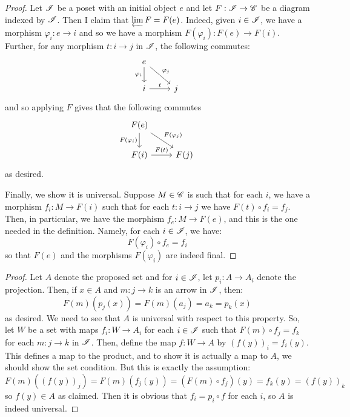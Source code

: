 \documentclass[12pt]{exam}
\begin{document}
\begin{proof}
	Let $\mathscr{I}$ be a poset with an initial object $e$ and let $F : \mathscr{I} \to \mathscr{C}$ be a diagram indexed by $\mathscr{I}$. Then I claim that $\varprojlim F = F(e)$. Indeed, given $i \in \mathscr{I}$, we have a morphism $\varphi_i : e \to i$ and so we have a morphism $F(\varphi_i) : F(e) \to F(i)$. Further, for any morphism $t : i \to j$ in $\mathscr{I}$, the following commutes:
	\[ \begin{tikzcd} e \arrow[swap]{d}{\varphi_i} \arrow{dr}{\varphi_j} \\ i \arrow{r}{t} & j \end{tikzcd} \]
	and so applying $F$ gives that the following commutes
	\[ \begin{tikzcd} F(e) \arrow[swap]{d}{F(\varphi_i)} \arrow{dr}{F(\varphi_j)} \\ F(i) \arrow{r}{F(t)} & F(j) \end{tikzcd} \]
	as desired.
	
	Finally, we show it is universal. Suppose $M \in \mathscr{C}$ is such that for each $i$, we have a morphism $f_i : M \to F(i)$ such that for each $t : i \to j$ we have $F(t) \circ f_i = f_j$. Then, in particular, we have the morphism $f_e : M \to F(e)$, and this is the one needed in the definition. Namely, for each $i \in \mathscr{I}$, we have:
	\[ F(\varphi_i) \circ f_e = f_i \]
	so that $F(e)$ and the morphisms $F(\varphi_i)$ are indeed final.
\end{proof}

\begin{proof}
	Let $A$ denote the proposed set and for $i \in \mathscr{I}$, let $p_i : A \to A_i$ denote the projection. Then, if $x \in A$ and $m : j \to k$ is an arrow in $\mathscr{I}$, then:
	\[ F(m)(p_j(x)) = F(m)(a_j) = a_k = p_k(x) \]
	as desired. We need to see that $A$ is universal with respect to this property. So, let $W$ be a set with maps $f_i : W \to A_i$ for each $i \in \mathscr{I}$ such that $F(m) \circ f_j = f_k$ for each $m : j \to k$ in $\mathscr{I}$. Then, define the map $f : W \to A$ by $(f(y))_i = f_i(y)$. This defines a map to the product, and to show it is actually a map to $A$, we should show the set condition. But this is exactly the assumption:
	\[ F(m)((f(y))_j) = F(m)(f_j(y)) = (F(m) \circ f_j)(y) = f_k(y) = (f(y))_k \]
	so $f(y) \in A$ as claimed. Then it is obvious that $f_i = p_i \circ f$ for each $i$, so $A$ is indeed universal.
\end{proof}
\end{document}

